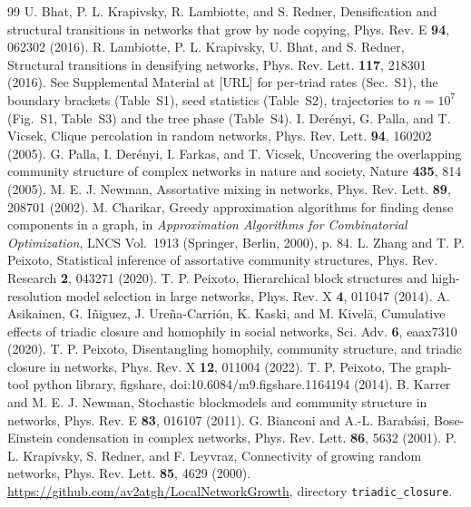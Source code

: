 \documentclass[aps,pre,twocolumn,superscriptaddress,floatfix,nofootinbib]{revtex4-2}
\begin{document}
\begin{thebibliography}{99}
 U. Bhat, P. L. Krapivsky, R. Lambiotte, and S. Redner, Densification and structural transitions in networks that grow by node copying, Phys. Rev. E \textbf{94}, 062302 (2016).
 R. Lambiotte, P. L. Krapivsky, U. Bhat, and S. Redner, Structural transitions in densifying networks, Phys. Rev. Lett. \textbf{117}, 218301 (2016).
 See Supplemental Material at [URL] for per-triad rates (Sec.~S1), the boundary brackets (Table~S1), seed statistics (Table~S2), trajectories to $n=10^7$ (Fig.~S1, Table~S3) and the tree phase (Table~S4).
 I. Der\'enyi, G. Palla, and T. Vicsek, Clique percolation in random networks, Phys. Rev. Lett. \textbf{94}, 160202 (2005).
 G. Palla, I. Der\'enyi, I. Farkas, and T. Vicsek, Uncovering the overlapping community structure of complex networks in nature and society, Nature \textbf{435}, 814 (2005).
 M. E. J. Newman, Assortative mixing in networks, Phys. Rev. Lett. \textbf{89}, 208701 (2002).
 M. Charikar, Greedy approximation algorithms for finding dense components in a graph, in \emph{Approximation Algorithms for Combinatorial Optimization}, LNCS Vol.~1913 (Springer, Berlin, 2000), p. 84.
 L. Zhang and T. P. Peixoto, Statistical inference of assortative community structures, Phys. Rev. Research \textbf{2}, 043271 (2020).
 T. P. Peixoto, Hierarchical block structures and high-resolution model selection in large networks, Phys. Rev. X \textbf{4}, 011047 (2014).
 A. Asikainen, G. I\~niguez, J. Ure\~na-Carri\'on, K. Kaski, and M. Kivel\"a, Cumulative effects of triadic closure and homophily in social networks, Sci. Adv. \textbf{6}, eaax7310 (2020).
 T. P. Peixoto, Disentangling homophily, community structure, and triadic closure in networks, Phys. Rev. X \textbf{12}, 011004 (2022).
 T. P. Peixoto, The graph-tool python library, figshare, doi:10.6084/m9.figshare.1164194 (2014).
 B. Karrer and M. E. J. Newman, Stochastic blockmodels and community structure in networks, Phys. Rev. E \textbf{83}, 016107 (2011).
 G. Bianconi and A.-L. Barab\'asi, Bose-Einstein condensation in complex networks, Phys. Rev. Lett. \textbf{86}, 5632 (2001).
 P. L. Krapivsky, S. Redner, and F. Leyvraz, Connectivity of growing random networks, Phys. Rev. Lett. \textbf{85}, 4629 (2000).
 \url{https://github.com/av2atgh/LocalNetworkGrowth}, directory \texttt{triadic\_closure}.
\end{thebibliography}
\end{document}
